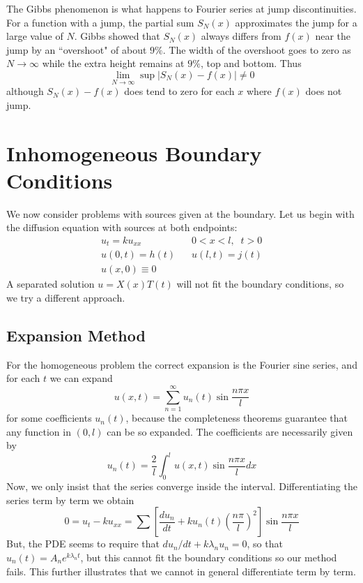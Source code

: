 \documentclass[12pt, a4paper, oneside, openright, titlepage]{book}
\begin{document}
The Gibbs phenomenon is what happens to Fourier series at jump discontinuities. For a function with a jump, the partial sum $S_N(x)$ approximates the jump for a large value of $N$. Gibbs showed that $S_N(x)$ always differs from $f(x)$ near the jump by an ``overshoot" of about $9\%$. The width of the overshoot goes to zero as $N\rightarrow \infty$ while the extra height remains at $9\%$, top and bottom. Thus \begin{equation*}
    \lim\limits_{N\rightarrow \infty}\sup|S_N(x) - f(x)| \neq 0
\end{equation*}
although $S_N(x)-f(x)$ does tend to zero for each $x$ where $f(x)$ does not jump.



\section{Inhomogeneous Boundary Conditions}


We now consider problems with sources given at the boundary. Let us begin with the diffusion equation with sources at both endpoints: \begin{align*}
    u_t=ku_{xx}&\;\;\;0 < x < l,\;\;t > 0 \\
    u(0,t)=h(t)&\;\;\;u(l,t) = j(t) \\
    u(x,0) \equiv 0&
\end{align*}
A separated solution $u=X(x)T(t)$ will not fit the boundary conditions, so we try a different approach.

\subsection{Expansion Method}

For the homogeneous problem the correct expansion is the Fourier sine series, and for each $t$ we can expand \begin{equation}
    u(x,t) = \sum_{n=1}^{\infty}u_n(t)\sin\frac{n\pi x}{l}
\end{equation}
for some coefficients $u_n(t)$, because the completeness theorems guarantee that any function in $(0,l)$ can be so expanded. The coefficients are necessarily given by \begin{equation*}
    u_n(t) = \frac{2}{l}\int_0^lu(x,t)\sin\frac{n\pi x}{l}dx
\end{equation*}
Now, we only insist that the series converge inside the interval. Differentiating the series term by term we obtain \begin{equation*}
    0 = u_t - ku_{xx} = \sum\left[\frac{d u_n}{dt} + ku_n(t)\left(\frac{n\pi}{l}\right)^2\right]\sin\frac{n\pi x}{l}
\end{equation*}
But, the PDE seems to require that $du_n/dt + k\lambda_nu_n = 0$, so that $u_n(t) = A_ne^{k\lambda_n t}$, but this cannot fit the boundary conditions so our method fails. This further illustrates that we cannot in general differentiate term by term.
\end{document}
